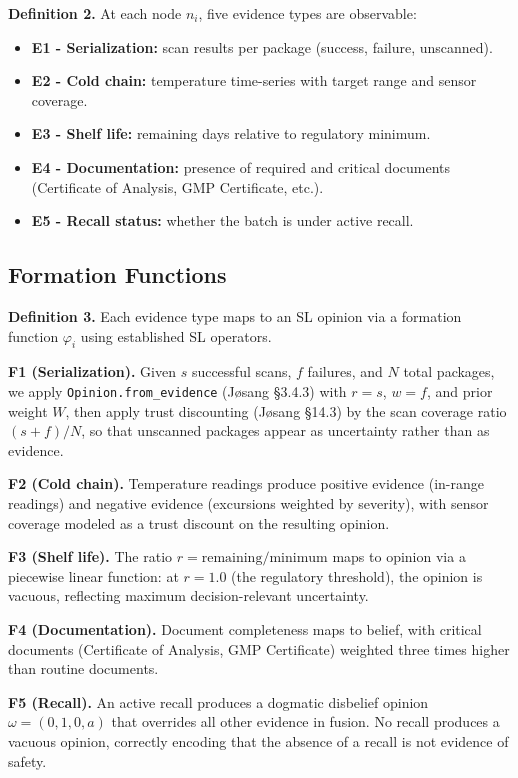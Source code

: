 \documentclass[conference]{IEEEtran}
\begin{document}
\textbf{Definition 2.} At each node $n_i$, five evidence types are
observable:
\begin{itemize}
\item \textbf{E1 - Serialization:} scan results per package (success,
      failure, unscanned).
\item \textbf{E2 - Cold chain:} temperature time-series with target
      range and sensor coverage.
\item \textbf{E3 - Shelf life:} remaining days relative to regulatory
      minimum.
\item \textbf{E4 - Documentation:} presence of required and critical
      documents (Certificate of Analysis, GMP Certificate, etc.).
\item \textbf{E5 - Recall status:} whether the batch is under active
      recall.
\end{itemize}

\subsection{Formation Functions}

\textbf{Definition 3.} Each evidence type maps to an SL opinion via a
formation function $\varphi_i$ using established SL operators.

\textbf{F1 (Serialization).} Given $s$ successful scans, $f$ failures,
and $N$ total packages, we apply \texttt{Opinion.from\_evidence}
(J\o sang \S3.4.3) with $r = s$, $w = f$, and prior weight $W$, then
apply trust discounting (J\o sang \S14.3) by the scan coverage ratio
$(s+f)/N$, so that unscanned packages appear as uncertainty rather than
as evidence.

\textbf{F2 (Cold chain).} Temperature readings produce positive evidence
(in-range readings) and negative evidence (excursions weighted by
severity), with sensor coverage modeled as a trust discount on the
resulting opinion.

\textbf{F3 (Shelf life).} The ratio $r = \text{remaining}/\text{minimum}$
maps to opinion via a piecewise linear function: at $r = 1.0$ (the
regulatory threshold), the opinion is vacuous, reflecting maximum
decision-relevant uncertainty.

\textbf{F4 (Documentation).} Document completeness maps to belief, with
critical documents (Certificate of Analysis, GMP Certificate) weighted
three times higher than routine documents.

\textbf{F5 (Recall).} An active recall produces a dogmatic disbelief
opinion $\omega = (0, 1, 0, a)$ that overrides all other evidence in
fusion. No recall produces a vacuous opinion, correctly encoding that
the absence of a recall is not evidence of safety.
\end{document}
